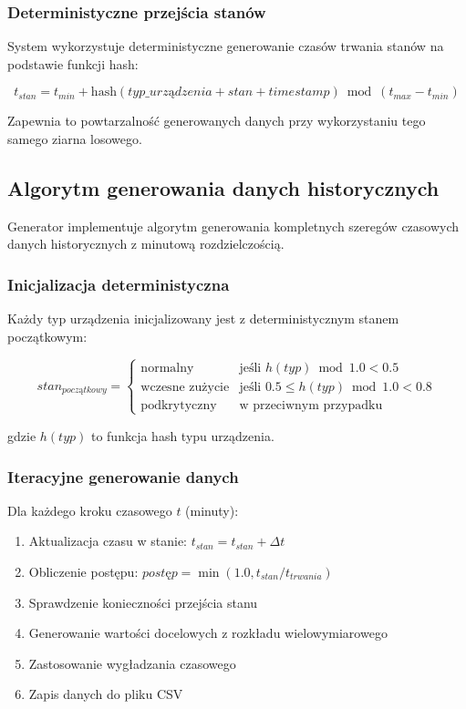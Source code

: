 \subsubsection{Deterministyczne przejścia stanów}

System wykorzystuje deterministyczne generowanie czasów trwania stanów na podstawie funkcji hash:

$$t_{stan} = t_{min} + \text{hash}(typ\_urządzenia + stan + timestamp) \bmod (t_{max} - t_{min})$$

Zapewnia to powtarzalność generowanych danych przy wykorzystaniu tego samego ziarna losowego.

\subsection{Algorytm generowania danych historycznych}
\label{subsec:algorytm_historycznych}

Generator implementuje algorytm generowania kompletnych szeregów czasowych danych historycznych z minutową rozdzielczością.

\subsubsection{Inicjalizacja deterministyczna}

Każdy typ urządzenia inicjalizowany jest z deterministycznym stanem początkowym:

$$stan_{początkowy} = \begin{cases}
\text{normalny} & \text{jeśli } h(typ) \bmod 1.0 < 0.5 \\
\text{wczesne zużycie} & \text{jeśli } 0.5 \leq h(typ) \bmod 1.0 < 0.8 \\
\text{podkrytyczny} & \text{w przeciwnym przypadku}
\end{cases}$$

gdzie $h(typ)$ to funkcja hash typu urządzenia.

\subsubsection{Iteracyjne generowanie danych}

Dla każdego kroku czasowego $t$ (minuty):

\begin{enumerate}
    \item Aktualizacja czasu w stanie: $t_{stan} = t_{stan} + \Delta t$
    \item Obliczenie postępu: $postęp = \min(1.0, t_{stan} / t_{trwania})$
    \item Sprawdzenie konieczności przejścia stanu
    \item Generowanie wartości docelowych z rozkładu wielowymiarowego
    \item Zastosowanie wygładzania czasowego
    \item Zapis danych do pliku CSV
\end{enumerate}

